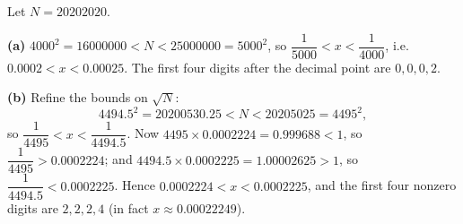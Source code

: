 Let $N=20202020$.

\textbf{(a)} $4000^2=16000000<N<25000000=5000^2$, so $\dfrac1{5000}<x<\dfrac1{4000}$, i.e. $0.0002<x<0.00025$. The first four digits after the decimal point are $\boxed{0,0,0,2}$.

\textbf{(b)} Refine the bounds on $\sqrt N$:
\[4494.5^2=20200530.25<N<20205025=4495^2,\]
so $\dfrac1{4495}<x<\dfrac1{4494.5}$. Now $4495\times0.0002224=0.999688<1$, so $\dfrac1{4495}>0.0002224$; and $4494.5\times0.0002225=1.00002625>1$, so $\dfrac1{4494.5}<0.0002225$. Hence $0.0002224<x<0.0002225$, and the first four nonzero digits are $\boxed{2,2,2,4}$ (in fact $x\approx0.00022249$).
